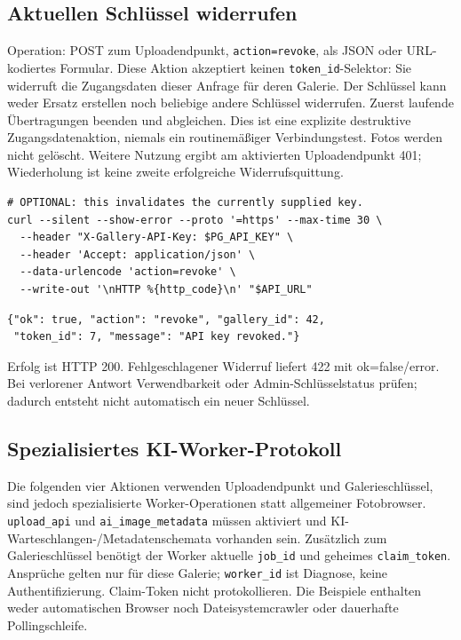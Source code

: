 \documentclass[11pt,a4paper]{article}
\newcommand{\codeword}[1]{\nolinkurl{#1}}
\begin{document}
\subsection{\texorpdfstring{Aktuellen Schlüssel widerrufen}{Aktuellen Schlüssel widerrufen}}

\label{api352:revoke}

Operation: POST zum Uploadendpunkt, \codeword{action=revoke}, als JSON oder URL-kodiertes
Formular. Diese Aktion akzeptiert keinen \codeword{token_id}-Selektor: Sie widerruft die
Zugangsdaten dieser Anfrage für deren Galerie. Der Schlüssel kann weder Ersatz erstellen
noch beliebige andere Schlüssel widerrufen. Zuerst laufende Übertragungen beenden und
abgleichen. Dies ist eine explizite destruktive Zugangsdatenaktion, niemals ein
routinemäßiger Verbindungstest. Fotos werden nicht gelöscht. Weitere Nutzung ergibt am
aktivierten Uploadendpunkt 401; Wiederholung ist keine zweite erfolgreiche
Widerrufsquittung.

\begin{lstlisting}[language={}]
# OPTIONAL: this invalidates the currently supplied key.
curl --silent --show-error --proto '=https' --max-time 30 \
  --header "X-Gallery-API-Key: $PG_API_KEY" \
  --header 'Accept: application/json' \
  --data-urlencode 'action=revoke' \
  --write-out '\nHTTP %{http_code}\n' "$API_URL"
\end{lstlisting}

\begin{lstlisting}[language={}]
{"ok": true, "action": "revoke", "gallery_id": 42,
 "token_id": 7, "message": "API key revoked."}
\end{lstlisting}

Erfolg ist HTTP 200. Fehlgeschlagener Widerruf liefert 422 mit ok=false/error. Bei
verlorener Antwort Verwendbarkeit oder Admin-Schlüsselstatus prüfen; dadurch entsteht nicht
automatisch ein neuer Schlüssel.

\subsection{\texorpdfstring{Spezialisiertes KI-Worker-Protokoll}{Spezialisiertes KI-Worker-Protokoll}}

\label{api352:ai-contract}

Die folgenden vier Aktionen verwenden Uploadendpunkt und Galerieschlüssel, sind jedoch
spezialisierte Worker-Operationen statt allgemeiner Fotobrowser. \codeword{upload_api} und
\codeword{ai_image_metadata} müssen aktiviert und KI-Warteschlangen-/Metadatenschemata
vorhanden sein. Zusätzlich zum Galerieschlüssel benötigt der Worker aktuelle
\codeword{job_id} und geheimes \codeword{claim_token}. Ansprüche gelten nur für diese
Galerie; \codeword{worker_id} ist Diagnose, keine Authentifizierung. Claim-Token nicht
protokollieren. Die Beispiele enthalten weder automatischen Browser noch Dateisystemcrawler
oder dauerhafte Pollingschleife.
\end{document}
